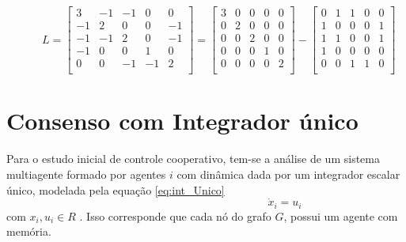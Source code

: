 \begin{equation}\label{eq:matriz_L1}
\hspace{1cm} %
    L = \begin{bmatrix}
         3 & -1 & -1 & 0 & 0 \\ 
         -1 & 2 & 0 & 0 & -1 \\ 
         -1 & -1 & 2 & 0 & -1 \\ 
         -1 & 0 & 0 & 1 & 0 \\ 
         0 & 0 & -1 & -1 & 2 \\ 
    \end{bmatrix}
    = \begin{bmatrix}
         3 & 0 & 0 & 0 & 0 \\ %
         0 & 2 & 0 & 0 & 0 \\ %
         0 & 0 & 2 & 0 & 0 \\ %
         0 & 0 & 0 & 1 & 0 \\ %
         0 & 0 & 0 & 0 & 2 \\ %
    \end{bmatrix}
    - \begin{bmatrix}
         0 & 1 & 1 & 0 & 0 \\ %
         1 & 0 & 0 & 0 & 1 \\ %
         1 & 1 & 0 & 0 & 1 \\ %
         1 & 0 & 0 & 0 & 0 \\ %
         0 & 0 & 1 & 1 & 0 \\ %
    \end{bmatrix}
\end{equation}


\section{Consenso com Integrador único}
Para o estudo inicial de controle cooperativo, tem-se a análise de um sistema multiagente formado por agentes $i$ com dinâmica dada por um integrador escalar único, modelada pela equação \ref{eq:int_Unico}
\begin{equation}\label{eq:int_Unico}
\hspace{6cm} %
    \dot x_{i}  = u_{i} 
\end{equation}
com $x_{i}, u_{i} \in R $ . Isso corresponde que cada nó do grafo $G$, possui um agente com memória.

